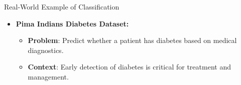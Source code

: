 \documentclass[serif, aspectratio=169]{beamer}
\begin{document}
    \begin{frame}{Real-World Example of Classification}
        \begin{itemize}
            \justifying
            \item \textbf{Pima Indians Diabetes Dataset:}
            \medskip
            \begin{itemize}\itemsep.8em
            \item \textbf{Problem}:
            Predict whether a patient has diabetes based on medical diagnostics.
            \item \textbf{Context}:
            Early detection of diabetes is critical for treatment and management.
            \end{itemize}
        \end{itemize}


\end{frame}
\end{document}
